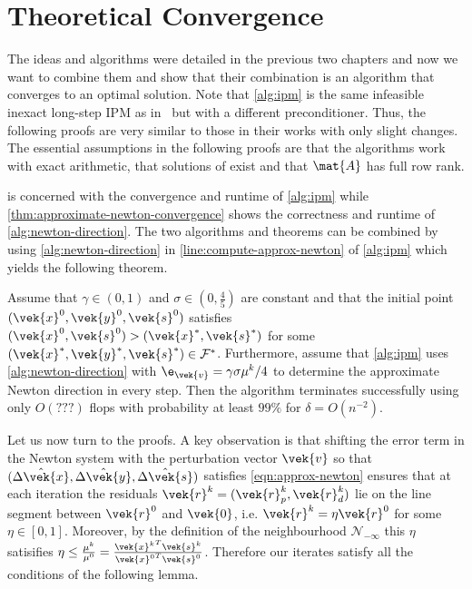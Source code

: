 \chapter{Theoretical Convergence}\label{chap:convergence}

The ideas and algorithms were detailed in the previous two chapters and now we want to combine them and show that their combination is an algorithm that converges to an optimal solution.
Note that \cref{alg:ipm} is the same infeasible inexact long-step IPM as in~\cite{Monteiro-ConvergenceAnalysisLongStepInfeasibleIPMs,Avron-FasterRandomizedInfeasibleIPMs} but with a different preconditioner.
Thus, the following proofs are very similar to those in their works with only slight changes.
The essential assumptions in the following proofs are that the algorithms work with exact arithmetic, that solutions of  exist and that \(\mat{A}\) has full row rank.

 is concerned with the convergence and runtime of \cref{alg:ipm} while \cref{thm:approximate-newton-convergence} shows the correctness and runtime of \cref{alg:newton-direction}.
The two algorithms and theorems can be combined by using \cref{alg:newton-direction} in \cref{line:compute-approx-newton} of \cref{alg:ipm} which yields the following theorem.

\begin{theorem}
Assume that \(\gamma \in (0, 1)\) and \(\sigma \in (0, \frac{4}{5})\) are constant and that the initial point \((\vek{x}^0, \vek{y}^0, \vek{s}^0)\) satisfies \((\vek{x}^0, \vek{s}^0) > (\vek{x}^*, \vek{s}^*)\) for some \((\vek{x}^*, \vek{y}^*, \vek{s}^*) \in \mathcal{F}^*\).
Furthermore, assume that \cref{alg:ipm} uses \cref{alg:newton-direction} with \(\e_{\vek{v}} = \gamma \sigma \mu^k / 4\) to determine the approximate Newton direction in every step.
Then the algorithm terminates successfully using only \(O(???)\) flops with probability at least \(99\%\) for \(\delta = O(n^{-2})\).
\end{theorem}

Let us now turn to the proofs.
A key observation is that shifting the error term in the Newton system with the perturbation vector \(\vek{v}\) so that \((\hat{\Delta\vek{x}}, \hat{\Delta\vek{y}}, \hat{\Delta\vek{s}})\) satisfies \cref{eqn:approx-newton} ensures that at each iteration the residuals \(\vek{r}^k = (\vek{r}_p^k, \vek{r}_d^k)\) lie on the line segment between \(\vek{r}^0\) and \(\vek{0}\), i.e. \(\vek{r}^k = \eta \vek{r}^0\) for some \(\eta \in [0, 1]\).
Moreover, by the definition of the neighbourhood \(\mathcal{N}_{-\infty}\) this \(\eta\) satisifies \(\eta \leq \frac{\mu^k}{\mu^0} = \frac{{\vek{x}^k}^T \vek{s}^k}{{\vek{x}^0}^T \vek{s}^0}\).
Therefore our iterates satisfy all the conditions of the following lemma.

